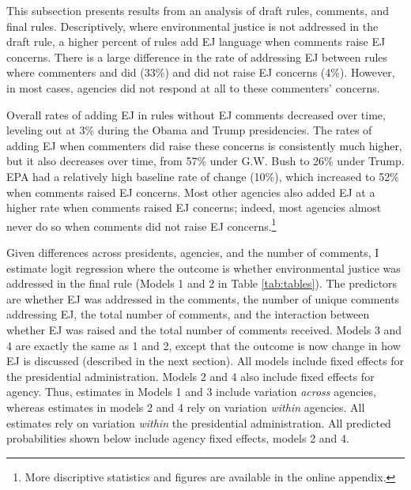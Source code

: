 \documentclass[
      12pt,
        ]{article}
\begin{document}
This subsection presents results from an analysis of draft
rules, comments, and final rules. Descriptively,
where environmental
justice is not addressed in the draft rule, a higher percent of rules add EJ language when comments raise EJ concerns. There is a large difference in the rate of addressing EJ between rules where commenters and did (33\%) and did not raise EJ concerns (4\%). However, in most cases, agencies did not respond at all to these commenters' concerns.

Overall rates of adding EJ in rules without EJ comments decreased over time, leveling out at 3\% during the Obama and Trump presidencies. The rates of adding EJ when commenters did raise these concerns is consistently much higher, but it also decreases over time, from 57\% under G.W. Bush to 26\% under Trump.
EPA had a relatively high baseline rate of change (10\%), which increased to 52\% when comments raised EJ concerns. Most other agencies also added EJ at a higher rate when comments raised EJ concerns; indeed, most agencies almost never do so when comments did not raise EJ concerns.\footnote{More discriptive statistics and figures are available in the online appendix.}

Given differences across presidents, agencies, and the number of comments, I estimate logit regression where the outcome is whether environmental justice was addressed in the final rule (Models 1 and 2 in Table \ref{tab:tables}). The predictors are
whether EJ was addressed in the comments, the number of unique comments addressing EJ, the total number of comments, and the interaction between whether EJ was raised and the total number of comments received. Models 3 and 4 are exactly the same as 1 and 2, except that the outcome is now change in how EJ is discussed (described in the next section). All models include fixed effects for the presidential administration. Models 2 and 4 also include fixed effects for agency. Thus, estimates in Models 1 and 3 include variation \emph{across} agencies, whereas estimates in models 2 and 4 rely on variation \emph{within} agencies. All estimates rely on variation \emph{within} the presidential administration.
All predicted probabilities shown below include agency fixed effects, models 2 and 4.
\end{document}
